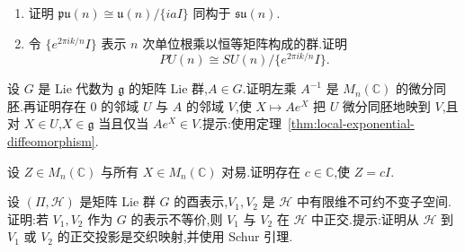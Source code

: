 {\begin{exercise}[射影酉群与特殊酉群]\label{ex:projective-unitary-group}
\begin{enumerate}
\item 证明 $\mathfrak{pu}(n)\cong\mathfrak u(n)/\{iaI\}$ 同构于 $\mathfrak{su}(n)$.
\item 令 $\{e^{2\pi ik/n}I\}$ 表示 $n$ 次单位根乘以恒等矩阵构成的群.证明
\[
PU(n)\cong SU(n)/\{e^{2\pi ik/n}I\}.
\]
\end{enumerate}
\end{exercise}

\begin{exercise}[单位元邻域的指数坐标]\label{ex:left-translation-exponential}
设 $G$ 是 Lie 代数为 $\mathfrak g$ 的矩阵 Lie 群,$A\in G$.证明左乘 $A^{-1}$ 是 $M_n(\mathbb C)$ 的微分同胚.再证明存在 $0$ 的邻域 $U$ 与 $A$ 的邻域 $V$,使 $X\mapsto Ae^X$ 把 $U$ 微分同胚地映到 $V$,且对 $X\in U$,$X\in\mathfrak g$ 当且仅当 $Ae^X\in V$.提示:使用定理~\ref{thm:local-exponential-diffeomorphism}.
\end{exercise}

\begin{exercise}[矩阵的交换子中心]\label{ex:scalar-commutant}
设 $Z\in M_n(\mathbb C)$ 与所有 $X\in M_n(\mathbb C)$ 对易.证明存在 $c\in\mathbb C$,使 $Z=cI$.
\end{exercise}

\begin{exercise}[不等价不可约子表示的正交性]\label{ex:inequivalent-unitary-subspaces-orthogonal}
设 $(\Pi,\mathcal H)$ 是矩阵 Lie 群 $G$ 的酉表示,$V_1,V_2$ 是 $\mathcal H$ 中有限维不可约不变子空间.证明:若 $V_1,V_2$ 作为 $G$ 的表示不等价,则 $V_1$ 与 $V_2$ 在 $\mathcal H$ 中正交.提示:证明从 $\mathcal H$ 到 $V_1$ 或 $V_2$ 的正交投影是交织映射,并使用 Schur 引理.
\end{exercise}

}

